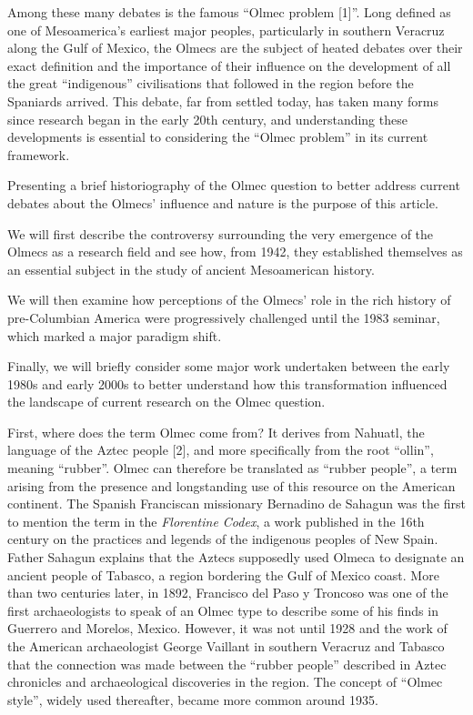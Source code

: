 \documentclass[11pt,a4paper]{article}
\begin{document}
Among these many debates is the famous ``Olmec problem {[}1{]}''. Long defined as one of Mesoamerica's earliest major peoples, particularly in southern Veracruz along the Gulf of Mexico, the Olmecs are the subject of heated debates over their exact definition and the importance of their influence on the development of all the great ``indigenous'' civilisations that followed in the region before the Spaniards arrived. This debate, far from settled today, has taken many forms since research began in the early 20th century, and understanding these developments is essential to considering the ``Olmec problem'' in its current framework.

Presenting a brief historiography of the Olmec question to better address current debates about the Olmecs' influence and nature is the purpose of this article.

We will first describe the controversy surrounding the very emergence of the Olmecs as a research field and see how, from 1942, they established themselves as an essential subject in the study of ancient Mesoamerican history.

We will then examine how perceptions of the Olmecs' role in the rich history of pre-Columbian America were progressively challenged until the 1983 seminar, which marked a major paradigm shift.

Finally, we will briefly consider some major work undertaken between the early 1980s and early 2000s to better understand how this transformation influenced the landscape of current research on the Olmec question.

First, where does the term Olmec come from? It derives from Nahuatl, the language of the Aztec people {[}2{]}, and more specifically from the root ``ollin'', meaning ``rubber''. Olmec can therefore be translated as ``rubber people'', a term arising from the presence and longstanding use of this resource on the American continent. The Spanish Franciscan missionary Bernadino de Sahagun was the first to mention the term in the \emph{Florentine Codex}, a work published in the 16th century on the practices and legends of the indigenous peoples of New Spain. Father Sahagun explains that the Aztecs supposedly used Olmeca to designate an ancient people of Tabasco, a region bordering the Gulf of Mexico coast. More than two centuries later, in 1892, Francisco del Paso y Troncoso was one of the first archaeologists to speak of an Olmec type to describe some of his finds in Guerrero and Morelos, Mexico. However, it was not until 1928 and the work of the American archaeologist George Vaillant in southern Veracruz and Tabasco that the connection was made between the ``rubber people'' described in Aztec chronicles and archaeological discoveries in the region. The concept of ``Olmec style'', widely used thereafter, became more common around 1935.
\end{document}
